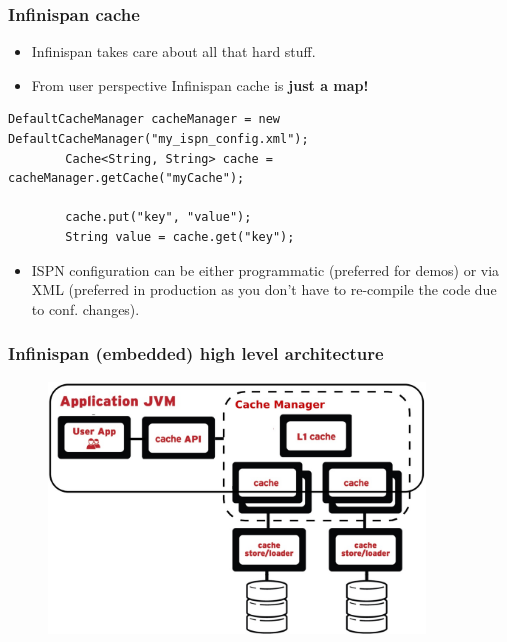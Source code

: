 \documentclass[10pt,utf8]{beamer}
\begin{document}
\begin{frame}[fragile]
	\frametitle{Infinispan cache}
	\begin{itemize}
		\item Infinispan takes care about all that hard stuff.
		\item From user perspective Infinispan cache is \textbf{just a map!}
	\end{itemize}
	\vspace{0.3cm}
	\begin{lstlisting}[style=Java]
		DefaultCacheManager cacheManager = new DefaultCacheManager("my_ispn_config.xml");
		Cache<String, String> cache = cacheManager.getCache("myCache");
		
		cache.put("key", "value");
		String value = cache.get("key");
	\end{lstlisting}
	\vspace{0.3cm}
	\begin{itemize}
		\item ISPN configuration can be either programmatic (preferred for demos) or via XML (preferred in production as you don't have to re-compile the code due to conf. changes). 
	\end{itemize}
\end{frame}

\begin{frame}
	\frametitle{Infinispan (embedded) high level architecture}
	\begin{figure}
		\centering
		\includegraphics[width=10cm]{./img/ispn_high_level_emb.eps}
	\end{figure}
\end{frame}
\end{document}
